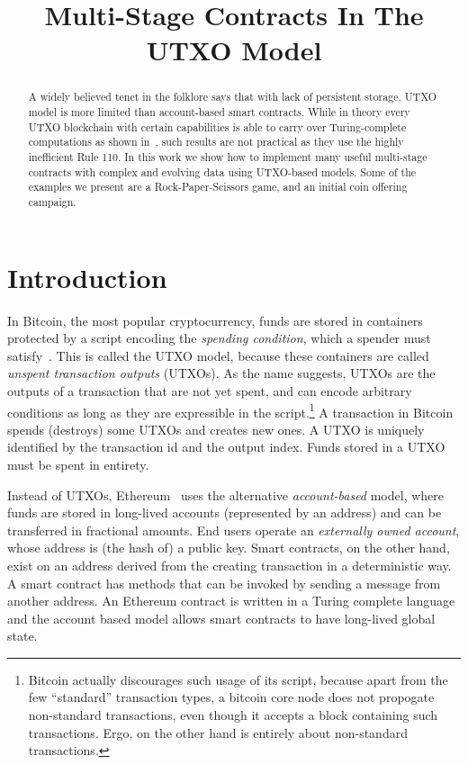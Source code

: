 \documentclass[11pt]{article}
\newcommand{\langname}{ErgoScript\xspace}
\begin{document}
\title{Multi-Stage Contracts In The UTXO Model}




\maketitle


\begin{abstract}
A widely believed tenet in the folklore says that with lack of persistent storage, UTXO model is more limited than account-based smart contracts. While in theory every UTXO blockchain with certain capabilities is able to carry over Turing-complete computations as shown in~\cite{CKM18a}, such results are not practical as they use the highly inefficient Rule 110.
In this work we show how to implement many useful multi-stage contracts with complex and evolving data using UTXO-based models. Some of the examples we present are a Rock-Paper-Scissors game, and an initial coin offering campaign.
\end{abstract}

\section{Introduction}

In Bitcoin, the most popular cryptocurrency, funds are stored in containers protected by a script encoding the {\em spending condition}, which a spender must satisfy~\cite{Nak08}. This is called the UTXO model, because these containers are called {\em unspent transaction outputs} (UTXOs). As the name suggests, UTXOs are the outputs of a transaction that are not yet spent, and can encode arbitrary conditions as long as they are expressible in the script.\footnote{Bitcoin actually discourages such usage of its script, because apart from the few ``standard'' transaction types, a bitcoin core node does not propogate non-standard transactions, even though it accepts a block containing such transactions. Ergo, on the other hand is entirely about non-standard transactions.} A transaction in Bitcoin spends (destroys) some UTXOs and creates new ones. A UTXO is uniquely identified by the transaction id and the output index. Funds stored in a UTXO must be spent in entirety. 

Instead of UTXOs, Ethereum~\cite{wood2014ethereum} uses the alternative {\em account-based} model, where funds are stored in long-lived accounts (represented by an address) and can be transferred in fractional amounts. End users operate an {\em externally owned account}, whose address is (the hash of) a public key. Smart contracts, on the other hand, exist on an address derived from the creating transaction in a deterministic way. A smart contract has methods that can be invoked by sending a message from another address. An Ethereum contract is written in a Turing complete language and the account based model allows smart contracts to have long-lived global state. %
\end{document}
